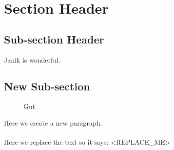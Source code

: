 \section{Section Header}

\subsection{Sub-section Header}

Janik is wonderful.

\subsection{New Sub-section}

\begin{figure}[ht!]
\centering
{}
\caption{Gut}
\end{figure}
\noindent
Here we create a new paragraph. \\ \\
Here we replace
the text so it says: <REPLACE_ME>
